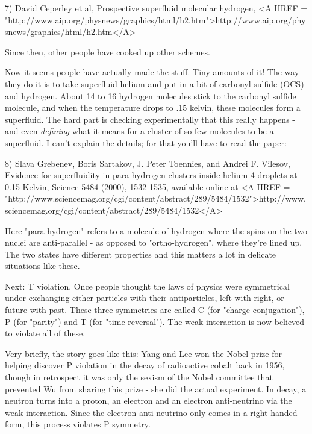 7) David Ceperley et al, Prospective superfluid molecular hydrogen, 
<A HREF = "http://www.aip.org/physnews/graphics/html/h2.htm">http://www.aip.org/physnews/graphics/html/h2.htm</A>

Since then, other people have cooked up other schemes.  

Now it seems people have actually made the stuff.  Tiny amounts of it!  
The way they do it is to take superfluid helium and put in a bit of 
carbonyl sulfide (OCS) and hydrogen.  About 14 to 16 hydrogen molecules 
stick to the carbonyl sulfide molecule, and when the temperature drops 
to .15 kelvin, these molecules form a superfluid.  The hard part is 
checking experimentally that this really happens - and even \emph{defining}
what it means for a cluster of so few molecules to be a superfluid.   
I can't explain the details; for that you'll have to read the paper:

8) Slava Grebenev, Boris Sartakov, J. Peter Toennies, and 
Andrei F. Vilesov, Evidence for superfluidity in para-hydrogen 
clusters inside helium-4 droplets at 0.15 Kelvin, Science 5484 
(2000), 1532-1535, available online at 
<A HREF = "http://www.sciencemag.org/cgi/content/abstract/289/5484/1532">http://www.sciencemag.org/cgi/content/abstract/289/5484/1532</A>

Here "para-hydrogen" refers to a molecule of hydrogen where the spins 
on the two nuclei are anti-parallel - as opposed to "ortho-hydrogen",
where they're lined up.  The two states have different properties and
this matters a lot in delicate situations like these.

Next: T violation.  Once people thought the laws of physics
were symmetrical under exchanging either particles with their
antiparticles, left with right, or future with past.  These three 
symmetries are called C (for "charge conjugation"), P (for "parity") 
and T (for "time reversal").  The weak interaction is now believed
to violate all of these.   

Very briefly, the story goes like this: Yang and Lee won the Nobel 
prize for helping discover P violation in the \beta  decay of radioactive
cobalt back in 1956, though in retrospect it was only the sexism 
of the Nobel committee that prevented Wu from sharing this prize - 
she did the actual experiment.   In \beta  decay, a neutron turns into
a proton, an electron and an electron anti-neutrino via the weak
interaction.  Since the electron anti-neutrino only comes in a
right-handed form, this process violates P symmetry.

